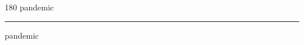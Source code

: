 
\begin{frame}
\begin{center}
\begin{turn}{180}
{\fontsize{2.5cm}{1em}\selectfont pandemic}
\end{turn}
\vspace{1em}\par  
\hrule
\vspace{1em}\par  
{\fontsize{2.5cm}{1em}\selectfont pandemic}
\end{center}
\end{frame}
